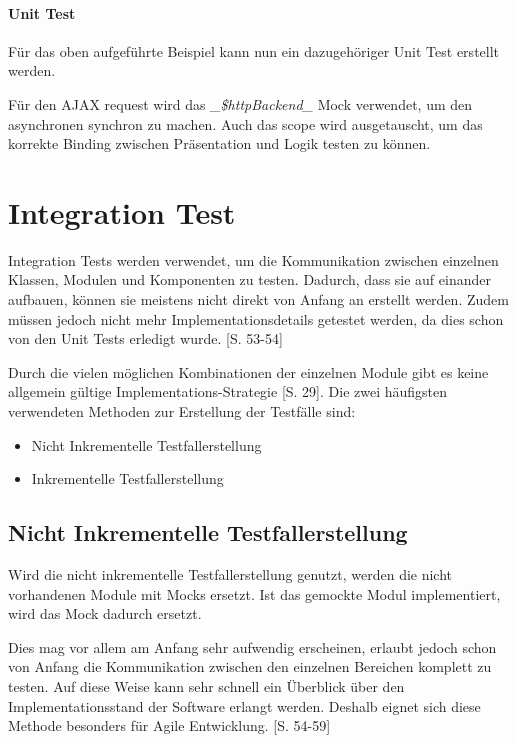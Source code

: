 \documentclass[a4paper,bibtotoc,oneside]{scrbook}
\begin{document}
\subsubsection{Unit Test}
Für das oben aufgeführte Beispiel kann nun ein dazugehöriger Unit Test erstellt werden.



Für den AJAX request wird das \emph{\_\$httpBackend\_} Mock verwendet, um den asynchronen synchron zu machen. Auch das scope wird ausgetauscht, um das korrekte Binding zwischen Präsentation und Logik testen zu können.


\chapter{Integration Test}
Integration Tests werden verwendet, um die Kommunikation zwischen einzelnen Klassen, Modulen und Komponenten zu testen. Dadurch, dass sie auf einander aufbauen, können sie meistens nicht direkt von Anfang an erstellt werden. Zudem müssen jedoch nicht mehr Implementationsdetails getestet werden, da dies schon von den Unit Tests erledigt wurde. \cite{test_large_systems}[S. 53-54]

Durch die vielen möglichen Kombinationen der einzelnen Module gibt es keine allgemein gültige Implementations-Strategie \cite{betrieb}[S. 29]. Die zwei häufigsten verwendeten Methoden zur Erstellung der Testfälle sind:

\begin{itemize}
	\item Nicht Inkrementelle Testfallerstellung
	\item Inkrementelle Testfallerstellung
\end{itemize}

\section{Nicht Inkrementelle Testfallerstellung}
Wird die nicht inkrementelle Testfallerstellung genutzt, werden die nicht vorhandenen Module mit Mocks ersetzt. Ist das gemockte Modul implementiert, wird das Mock dadurch ersetzt. 

Dies mag vor allem am Anfang sehr aufwendig erscheinen, erlaubt jedoch schon von Anfang die Kommunikation zwischen den einzelnen Bereichen komplett zu testen. Auf diese Weise kann sehr schnell ein Überblick über den Implementationsstand der Software erlangt werden. Deshalb eignet sich diese Methode besonders für Agile Entwicklung. \cite{test_large_systems}[S. 54-59] 
\end{document}
